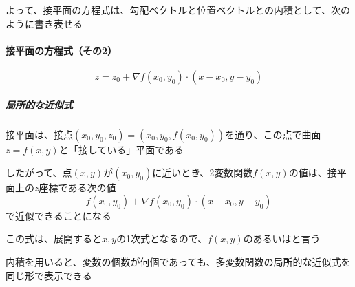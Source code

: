 \documentclass[../book_jiriki_calc]{subfiles}
\begin{document}
よって、接平面の方程式は、勾配ベクトルと位置ベクトルとの内積として、次のように書き表せる

\sectionline

\paragraph{接平面の方程式（その2）}

\begin{equation*}
  z = z_0 + \nabla f(x_0,y_0)\cdot(x-x_0,y-y_0)
\end{equation*}

\sectionline

\subparagraph{局所的な近似式}

接平面は、接点$(x_0,y_0,z_0) = (x_0,y_0,f(x_0,y_0))$を通り、この点で曲面$z=f(x,y)$と「接している」平面である

\br

したがって、点$(x,y)$が$(x_0,y_0)$に近いとき、2変数関数$f(x,y)$の値は、接平面上の$z$座標である次の値
\begin{equation*}
  f(x_0,y_0) + \nabla f(x_0,y_0)\cdot(x-x_0,y-y_0)
\end{equation*}
で近似できることになる

この式は、展開すると$x,y$の1次式となるので、$f(x,y)$のあるいはと言う

\br

内積を用いると、変数の個数が何個であっても、多変数関数の局所的な近似式を同じ形で表示できる
\end{document}
